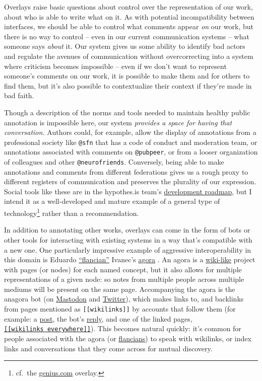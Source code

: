Overlays raise basic questions about control over the representation of
our work, about who is able to write what on it. As with potential
incompatibility between interfaces, we should be able to control what
comments appear \emph{on} our work, but there is no way to control --
even in our current communication systems -- what someone says
\emph{about} it. Our system gives us some ability to identify bad actors
and regulate the avenues of communication without overcorrecting into a
system where criticism becomes impossible -- even if we don't want to
represent someone's comments on our work, it is possible to make them
and for others to find them, but it's also possible to contextualize
their context if they're made in bad faith.

Though a description of the norms and tools needed to maintain healthy
public annotation is impossible here, our system \emph{provides a space
for having that conversation.} Authors could, for example, allow the
display of annotations from a professional society like \texttt{@sfn}
that has a code of conduct and moderation team, or annotations
associated with comments on \texttt{@pubpeer}, or from a looser
organization of colleagues and other \texttt{@neurofriends}. Conversely,
being able to make annotations and comments from different federations
gives us a rough proxy to different registers of communication and
preserves the plurality of our expression. Social tools like these are
in the hypothes.is team's
\href{https://web.archive.org/web/20211015213849/https://github.com/hypothesis/product-backlog/projects/6}{development
roadmap}, but I intend it as a well-developed and mature example of a
general type of technology\footnote{cf.~the
  \href{https://genius.com}{genius.com} overlay.} rather than a
recommendation.

In addition to annotating other works, overlays can come in the form of
bots or other tools for interacting with existing systems in a way
that's compatible with a new one. One particularly impressive example of
aggressive interoperability in this domain is Eduardo
\href{https://flancia.org/}{``flancian''} Ivanec's
\href{https://anagora.org/}{agora} \citep{ivanecFutureNoteTaking2021, velitchkovPersonalKnowledgeGraphs} . An agora is a
\href{https://anagora.org/wiki-like}{wiki-like} project with pages (or
nodes) for each named concept, but it also allows for multiple
representations of a given node: so notes from multiple people across
multiple mediums will be present on the same page. Accompanying the
agora is the anagora bot (on
\href{https://botsin.space/@agora}{Mastodon} and
\href{https://twitter.com/an_agora}{Twitter}), which makes links to, and
backlinks from pages mentioned as \texttt{{[}{[}wikilinks{]}{]}} by
accounts that follow them (for example: a
\href{https://social.coop/@jonny/108621001205679783}{post}, the bot's
\href{https://botsin.space/@agora/108621001318792297}{reply}, and one of
the linked pages,
\href{https://anagora.org/Wikilinks+Everywhere}{\texttt{{[}{[}wikilinks\ everywhere{]}{]}}}).
This becomes natural quickly: it's common for people associated with the
agora (or \href{https://flancia.org/manifesto/}{flancians}) to speak
with wikilinks, or index links and conversations that they come across
for mutual discovery.

